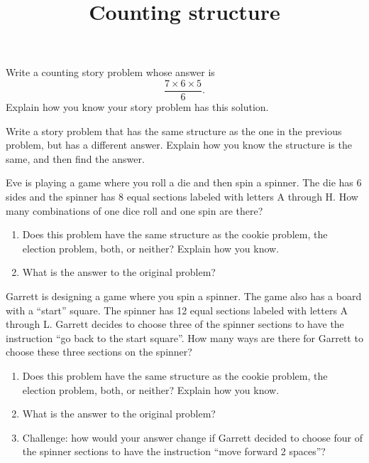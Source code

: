\documentclass[nooutcomes,noauthor, handout]{ximera}
\title{Counting structure}
\begin{document}
\begin{abstract}
\end{abstract}
\maketitle



\begin{problem}

Write a counting story problem whose answer is
\[
\frac{7 \times 6 \times 5}{6}.
\]
Explain how you know your story problem has this solution.


\end{problem}


\begin{problem}

Write a story problem that has the same structure as the one in the previous problem, but has a different answer. Explain how you know the structure is the same, and then find the answer.

\end{problem}



\begin{problem}

Eve is playing a game where you roll a die and then spin a spinner. The die has 6 sides and the spinner has 8 equal sections labeled with letters A through H. How many combinations of one dice roll and one spin are there?

\begin{enumerate}
	\item Does this problem have the same structure as the cookie problem, the election problem, both, or neither? Explain how you know.
	\item What is the answer to the original problem?
\end{enumerate}

\end{problem}

\begin{problem}

Garrett is designing a game where you spin a spinner. The game also has a board with a ``start'' square. The spinner has 12 equal sections labeled with letters A through L. Garrett decides to choose three of the spinner sections to have the instruction ``go back to the start square''. How many ways are there for Garrett to choose these three sections on the spinner?

\begin{enumerate}
	\item Does this problem have the same structure as the cookie problem, the election problem, both, or neither? Explain how you know.
	\item What is the answer to the original problem?
	\item Challenge: how would your answer change if Garrett decided to choose four of the spinner sections to have the instruction ``move forward 2 spaces''?
\end{enumerate}

\end{problem}
\end{document}
